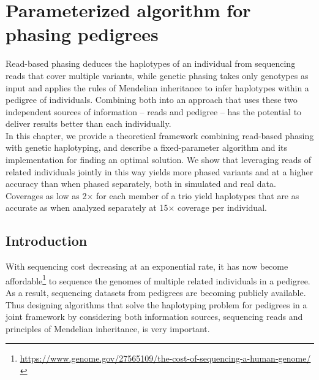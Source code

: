 \chapter{Parameterized algorithm for phasing pedigrees}\label{ref:chp5}
Read-based phasing deduces the haplotypes of an individual from sequencing reads that cover multiple variants, while genetic phasing takes only genotypes as input and applies the rules of Mendelian inheritance to infer haplotypes within a pedigree of individuals.
Combining both into an approach that uses these two independent sources of information -- reads and pedigree -- has the potential to deliver results better than each individually.\\

In this chapter, we provide a theoretical framework combining read-based phasing with genetic haplotyping, and describe a fixed-parameter algorithm and its implementation for finding an optimal solution.
We show that leveraging reads of related individuals jointly in this way yields more phased variants and at a higher accuracy than when phased separately, both in simulated and real data.
Coverages as low as 2$\times$ for each member of a trio yield haplotypes that are as accurate as when analyzed separately at 15$\times$ coverage per individual.

\section{Introduction}\label{sec:intro}
With sequencing cost decreasing at an exponential rate, it has now become affordable\footnote{\scriptsize{\url{https://www.genome.gov/27565109/the-cost-of-sequencing-a-human-genome/}}} to sequence the genomes of multiple related individuals in a pedigree.
As a result, sequencing datasets from pedigrees are becoming publicly available.
Thus designing algorithms that solve the haplotyping problem for pedigrees in a joint framework by considering both information sources, sequencing reads and principles of Mendelian inheritance, is very important.

